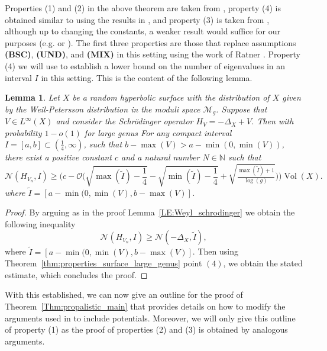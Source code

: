 \documentclass[11pt,twoside,reqno]{amsart}
\newcommand{\N}{\mathbb{N}}
\newcommand{\1}{\mathrm{\mathbf{1}}}
\DeclareMathOperator{\Vol}{Vol}
\numberwithin{equation}{section}
\theoremstyle{plain}
\newtheorem{lemma}[thm]{Lemma}
\theoremstyle{definition}
\theoremstyle{remark}
\begin{document}
Properties (1) and (2) in the above theorem are taken from \cite{monkBenjaminiSchrammConvergence2022}, property (4) is obtained similar to \cite[Theorem 6.2]{lemassonQuantumErgodicityEisenstein2024} using the results in \cite{monkBenjaminiSchrammConvergence2022}, and property (3) is taken from \cite{AnantharamanMonk2025,HideMaceraThomas2025b}, although up to changing the constants, a weaker result would suffice for our purposes (e.g. \cite{mirzakhaniGrowthWeilPeterssonVolumes2013} or \cite{WuXue}). The first three properties are those that replace assumptions \textbf{(BSC)}, \textbf{(UND)}, and \textbf{(MIX)} in this setting using the work of Ratner \cite{Ratner}. Property (4) we will use to establish a lower bound on the number of eigenvalues in an interval $I$ in this setting. This is the content of the following lemma. 

\begin{lemma}\label{LE:Weyl_schrodinger_proba}
Let $X$ be a random hyperbolic surface with the distribution of $X$ given by the Weil-Petersson distribution in the moduli space $\mathcal{M}_g$. Suppose that $V\in L^\infty(X)$ and consider the Schr\"odinger operator $H_V = -\Delta_X+V$. Then with probability $1-o(1)$ for large genus For any compact interval $I = [a,b]\subset (\frac{1}{4},\infty)$, such that $b-\max(V)>a  -\min(0, \min(V))$, there exist a positive constant $c$ and a natural number $N\in\N$ such that 
\begin{equation}
    \mathcal{N}(H_{V_n},I) \geq \Bigg( c - \mathcal{O} \bigg(\sqrt{\max(\tilde{I}) -\frac{1}{4}} - \sqrt{\min(\tilde{I})-\frac{1}{4}} +\sqrt{\tfrac{\max(\tilde{I}) +1}{\log(g)}} \bigg) \Bigg) \Vol(X). 
\end{equation}
where $\tilde{I}=[a-\min(0,\min(V),b- \max(V)]$.
\end{lemma}
\begin{proof}
 By arguing as in the proof Lemma~\ref{LE:Weyl_schrodinger} we obtain the following inequality
 \begin{equation*}
    \mathcal{N}(H_{V_n},I) \geq \mathcal{N}(-\Delta_X,\tilde{I}),
\end{equation*}
where $\tilde{I} = [a-\min(0,\min(V),b- \max(V)]$. Then using Theorem~\ref{thm:properties_surface_large_genus} point $(4)$, we obtain the stated estimate, which concludes the proof. 
\end{proof}

With this established, we can now give an outline for the proof of Theorem~\ref{Thm:propalistic_main} that provides details on how to modify the arguments used in \cite{lemassonQuantumErgodicityEisenstein2024} to include potentials.  Moreover, we will only give this outline of property (1) as the proof of properties (2) and (3) is obtained by analogous arguments.
\end{document}
